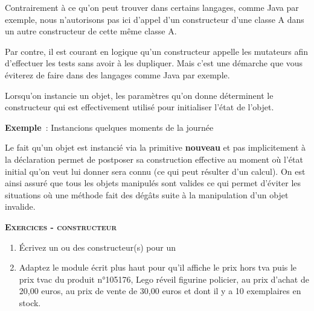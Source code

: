
Contrairement à ce qu'on peut trouver dans certains langages, 
comme Java par exemple, nous n'autorisons pas ici d'appel 
d'un constructeur d'une classe A dans un autre constructeur 
de cette même classe A.

Par contre, il est courant en logique qu'un constructeur 
appelle les mutateurs afin d'effectuer les tests sans 
avoir à les dupliquer.
Mais c'est une démarche que vous éviterez de faire dans
des langages comme Java par exemple.

Lorsqu'on instancie un objet, les paramètres
qu'on donne déterminent le constructeur qui est
effectivement utilisé pour initialiser l'état de
l'objet.

{
\textbf{Exemple}~: Instancions quelques moments de la journée}


Le fait qu'un objet est instancié via la primitive
\textbf{nouveau} et pas implicitement à la déclaration permet de
postposer sa construction effective au moment où
l'état initial qu'on veut lui donner
sera connu (ce qui peut résulter d'un calcul). On est
ainsi assuré que tous les objets manipulés sont valides ce qui permet
d’éviter les situations où une méthode fait des dégâts suite à la
manipulation d’un objet invalide.

{\sffamily\bfseries\scshape
Exercices - constructeur}

\begin{enumerate}
	\item {
		Écrivez un ou des constructeur(s) pour un }
	\item {
		Adaptez le module écrit plus haut pour qu'il affiche le prix hors tva
		puis le prix tvac du produit n°105176, Lego réveil figurine policier, 
		au prix d'achat de 20,00 euros, au prix de vente de 30,00 euros et 
		dont il y a 10 exemplaires en stock.}
\end{enumerate}


